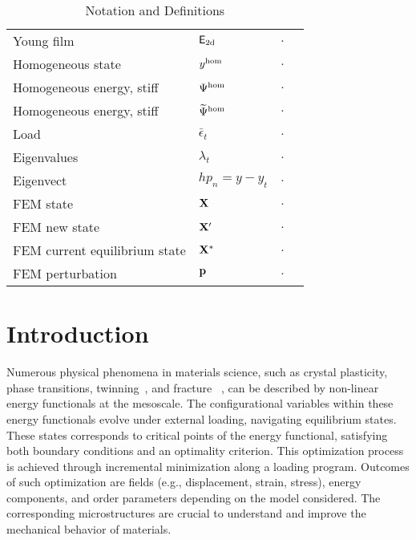 \begin{table}[h!]
\begin{tabular}{  m{3.5cm}  m{3cm}  m{2.5cm}  m{6cm}  }
     Young film & $\mathsf{E_{\text{2d}}}$ & $.$ & \\
    Homogeneous state  & $y^{\text{hom}}$ & $.$ & \\
    Homogeneous energy, stiff   & $\Psi^\text{hom}$ & $.$ & \\
    Homogeneous energy, stiff   & $\widetilde\Psi^\text{hom}$ & $.$ & \\
     Load & $\bar\epsilon_t$ & $.$ & \\
     Eigenvalues & $\lambda_t$ & $.$ & \\
     Eigenvect & $hp_n = y - y_t $ & $.$ & \\
     FEM state & $\mathbf{X}$ & $.$ & \\
     FEM new state & $\mathbf{X}'$ & $.$ & \\
     FEM current equilibrium state & $\mathbf{X^*}$ & $.$ & \\
     FEM perturbation & $\mathbf{p}$ & $.$ & \\
    \end{tabular}
    \caption{Notation and Definitions}
\label{table:notation}
\end{table}

\section{Introduction}
Numerous physical phenomena in materials science, such as crystal plasticity, phase transitions, twinning~\cite{Clayton2011-xq}, and fracture ~\cite{Baldelli2014-ho,Baldelli2021-gc}, can be described by non-linear energy functionals at the mesoscale. 
The configurational variables within these energy functionals evolve under external loading, navigating equilibrium states. These states corresponds to critical points of the energy functional, satisfying both boundary conditions and an optimality criterion.
This optimization process is achieved through incremental minimization along a loading program. Outcomes of such optimization are fields
(e.g., displacement, strain, stress), energy components, and order parameters depending on the model considered. The corresponding microstructures are crucial to understand and improve the mechanical behavior of materials.

